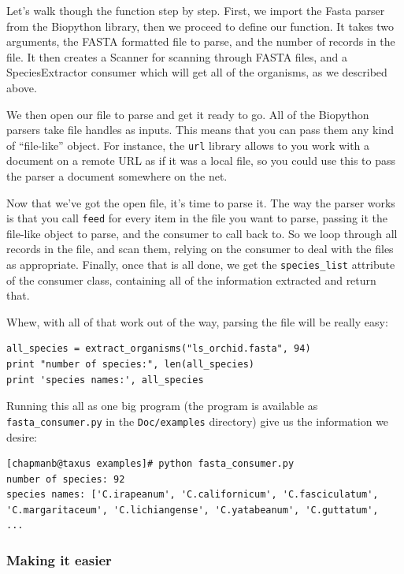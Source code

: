 \documentclass{article}
\begin{document}
Let's walk though the function step by step. First, we import the Fasta parser from the Biopython library, then we proceed to define our function. It takes two arguments, the FASTA formatted file to parse, and the number of records in the file. It then creates a Scanner for scanning through FASTA files, and a SpeciesExtractor consumer which will get all of the organisms, as we described above.

We then open our file to parse and get it ready to go. All of the Biopython parsers take file handles as inputs. This means that you can pass them any kind of ``file-like'' object. For instance, the \verb|url| library allows to you work with a document on a remote URL as if it was a local file, so you could use this to pass the parser a document somewhere on the net.


Now that we've got the open file, it's time to parse it. The way the parser works is that you call \verb|feed| for every item in the file you want to parse, passing it the file-like object to parse, and the consumer to call back to. So we loop through all records in the file, and scan them, relying on the consumer to deal with the files as appropriate. Finally, once that is all done, we get the \verb|species_list| attribute of the consumer class, containing all of the information extracted and return that.


Whew, with all of that work out of the way, parsing the file will be really easy:

\begin{verbatim}
all_species = extract_organisms("ls_orchid.fasta", 94)
print "number of species:", len(all_species)
print 'species names:', all_species
\end{verbatim}

Running this all as one big program (the program is available as \verb|fasta_consumer.py| in the \verb|Doc/examples| directory) give us the information we desire:

\begin{verbatim}
[chapmanb@taxus examples]# python fasta_consumer.py
number of species: 92
species names: ['C.irapeanum', 'C.californicum', 'C.fasciculatum', 
'C.margaritaceum', 'C.lichiangense', 'C.yatabeanum', 'C.guttatum',
...
\end{verbatim}

\subsubsection{Making it easier}
\end{document}
